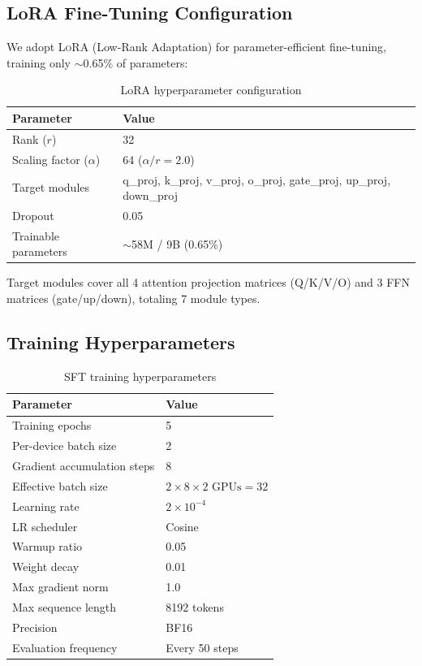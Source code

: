 \documentclass[12pt, a4paper]{article}
\newcommand{\lora}{\textsc{LoRA}}
\begin{document}
\subsection{LoRA Fine-Tuning Configuration}

We adopt \lora{} (Low-Rank Adaptation) for parameter-efficient fine-tuning, training only $\sim$0.65\% of parameters:

\begin{table}[H]
\centering
\caption{LoRA hyperparameter configuration}
\label{tab:lora-config}
\small
\begin{tabular}{ll}
\toprule
\textbf{Parameter} & \textbf{Value} \\
\midrule
Rank ($r$)                & 32 \\
Scaling factor ($\alpha$) & 64 ($\alpha/r = 2.0$) \\
Target modules           & q\_proj, k\_proj, v\_proj, o\_proj, gate\_proj, up\_proj, down\_proj \\
Dropout                  & 0.05 \\
Trainable parameters     & $\sim$58M / 9B (0.65\%) \\
\bottomrule
\end{tabular}
\end{table}

\noindent
Target modules cover all 4 attention projection matrices (Q/K/V/O) and 3 FFN matrices (gate/up/down), totaling 7 module types.

\subsection{Training Hyperparameters}

\begin{table}[H]
\centering
\caption{SFT training hyperparameters}
\label{tab:sft-config}
\small
\begin{tabular}{ll}
\toprule
\textbf{Parameter} & \textbf{Value} \\
\midrule
Training epochs                & 5 \\
Per-device batch size          & 2 \\
Gradient accumulation steps    & 8 \\
Effective batch size           & $2 \times 8 \times 2\text{ GPUs} = 32$ \\
Learning rate                  & $2 \times 10^{-4}$ \\
LR scheduler                  & Cosine \\
Warmup ratio                  & 0.05 \\
Weight decay                  & 0.01 \\
Max gradient norm             & 1.0 \\
Max sequence length           & 8192 tokens \\
Precision                     & BF16 \\
Evaluation frequency          & Every 50 steps \\
\bottomrule
\end{tabular}
\end{table}
\end{document}
